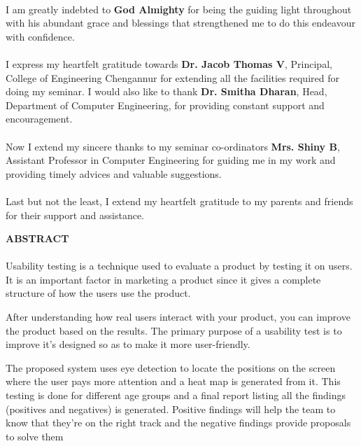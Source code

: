 \documentclass[a4paper,12pt,oneside]{article}
\begin{document}
\paragraph{}
I am greatly indebted to \textbf{God Almighty} for being the guiding light throughout with his
abundant grace and blessings that strengthened me to do this endeavour with confidence.
\paragraph{}
I express my heartfelt gratitude towards \textbf{Dr. Jacob Thomas V}, Principal, College
of Engineering Chengannur for extending all the facilities required for doing my seminar.
I would also like to thank \textbf{Dr. Smitha Dharan}, Head, Department of Computer
Engineering, for providing constant support and encouragement.
\paragraph{}
Now I extend my sincere thanks to my seminar co-ordinators \textbf{Mrs. Shiny B}, Assistant
Professor in Computer Engineering for guiding me in my work and providing timely
advices and valuable suggestions.
\paragraph{}
Last but not the least, I extend my heartfelt gratitude to my parents and friends for
their support and assistance.	

\newpage
\begin{center}
\large{\textbf{ABSTRACT}}
\end{center}
\vspace{4ex}
\paragraph{}
Usability testing is a technique used to evaluate a product by testing it on users. It is an important factor in marketing a product since it gives a complete structure of how the users use the product.

After understanding how real users interact with your product, you can improve the product based on the results. The primary purpose of a usability test is to improve it’s designed so as to make it more user-friendly.

The proposed system uses eye detection to locate the positions on the screen where the user pays more attention and a heat map is generated from it. This testing is done for different age groups and a final report listing all the findings (positives and negatives) is generated. Positive findings will help the team to know that they’re on the right track and the negative findings provide proposals to solve them
\end{document}

